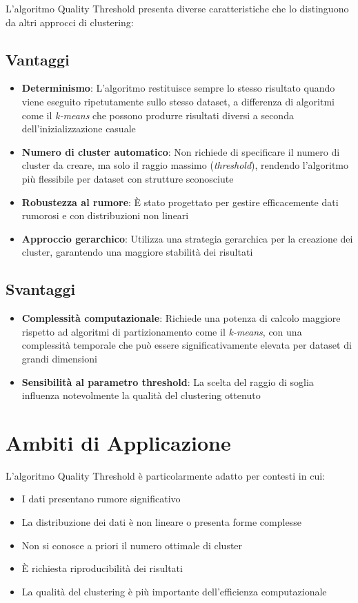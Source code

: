 L'algoritmo Quality Threshold presenta diverse caratteristiche che lo distinguono da altri approcci di clustering:

\subsection{Vantaggi}

\begin{itemize}
\item \textbf{Determinismo}: L'algoritmo restituisce sempre lo stesso risultato quando viene eseguito ripetutamente sullo stesso dataset, a differenza di algoritmi come il \textit{k-means} che possono produrre risultati diversi a seconda dell'inizializzazione casuale
\item \textbf{Numero di cluster automatico}: Non richiede di specificare il numero di cluster da creare, ma solo il raggio massimo (\textit{threshold}), rendendo l'algoritmo più flessibile per dataset con strutture sconosciute
\item \textbf{Robustezza al rumore}: È stato progettato per gestire efficacemente dati rumorosi e con distribuzioni non lineari
\item \textbf{Approccio gerarchico}: Utilizza una strategia gerarchica per la creazione dei cluster, garantendo una maggiore stabilità dei risultati
\end{itemize}

\subsection{Svantaggi}

\begin{itemize}
\item \textbf{Complessità computazionale}: Richiede una potenza di calcolo maggiore rispetto ad algoritmi di partizionamento come il \textit{k-means}, con una complessità temporale che può essere significativamente elevata per dataset di grandi dimensioni
\item \textbf{Sensibilità al parametro threshold}: La scelta del raggio di soglia influenza notevolmente la qualità del clustering ottenuto
\end{itemize}

\section{Ambiti di Applicazione}

L'algoritmo Quality Threshold è particolarmente adatto per contesti in cui:

\begin{itemize}
\item I dati presentano rumore significativo
\item La distribuzione dei dati è non lineare o presenta forme complesse
\item Non si conosce a priori il numero ottimale di cluster
\item È richiesta riproducibilità dei risultati
\item La qualità del clustering è più importante dell'efficienza computazionale
\end{itemize}